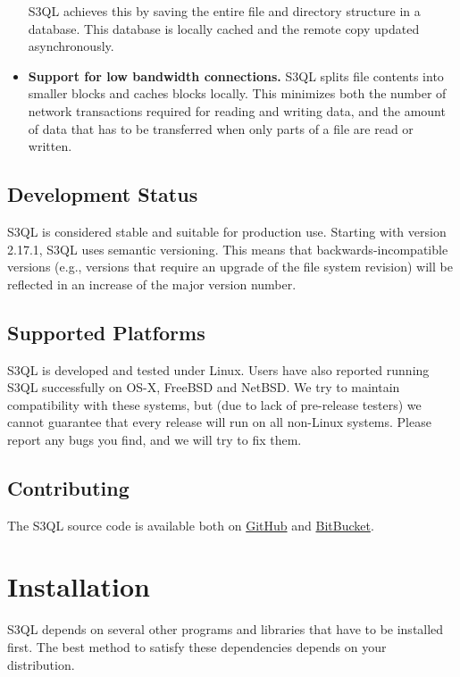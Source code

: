 \documentclass[letterpaper,10pt,english]{sphinxmanual}
\begin{document}
\begin{itemize}
S3QL achieves this by saving the entire file and directory structure
in a database. This database is locally cached and the remote
copy updated asynchronously.

\item {} 
\textbf{Support for low bandwidth connections.} S3QL splits file contents
into smaller blocks and caches blocks locally. This minimizes both
the number of network transactions required for reading and writing
data, and the amount of data that has to be transferred when only
parts of a file are read or written.

\end{itemize}


\section{Development Status}
\label{about:development-status}
S3QL is considered stable and suitable for production use.  Starting
with version 2.17.1, S3QL uses semantic versioning. This means that
backwards-incompatible versions (e.g., versions that require an
upgrade of the file system revision) will be reflected in an increase
of the major version number.


\section{Supported Platforms}
\label{about:supported-platforms}
S3QL is developed and tested under Linux. Users have also reported
running S3QL successfully on OS-X, FreeBSD and NetBSD. We try to
maintain compatibility with these systems, but (due to lack of
pre-release testers) we cannot guarantee that every release will run
on all non-Linux systems. Please report any bugs you find, and we will
try to fix them.


\section{Contributing}
\label{about:contributing}
The S3QL source code is available both on \href{https://github.com/s3ql/main}{GitHub} and \href{https://bitbucket.org/nikratio/s3ql/}{BitBucket}.


\chapter{Installation}
\label{installation::doc}\label{installation:installation}\label{installation:github}
S3QL depends on several other programs and libraries that have to be
installed first. The best method to satisfy these dependencies depends
on your distribution.
\end{document}

